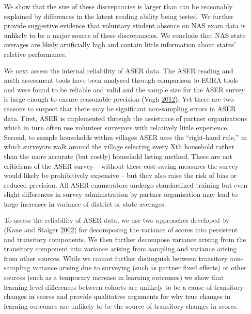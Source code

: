 \documentclass[
  11pt,
]{article}
\begin{document}
We show that the size of these discrepancies is larger than can be reasonably explained by differences in the latent reading ability being tested. We further provide suggestive evidence that voluntary student absence on NAS exam data is unlikely to be a major source of these discrepancies. We conclude that NAS state averages are likely artificially high and contain little information about states' relative performance.

We next assess the internal reliability of ASER data. The ASER reading and math assessment tools have been analysed through comparison to EGRA tools and were found to be reliable and valid and the sample size for the ASER survey is large enough to ensure reasonable precision (Vagh \protect\hyperlink{ref-vagh2012validating}{2012}). Yet there are two reasons to suspect that there may be significant non-sampling errors in ASER data. First, ASER is implemented through the assistance of partner organizations which in turn often use volunteer surveyors with relatively little experience. Second, to sample households within villages ASER uses the ``right-hand rule,'' in which surveyors walk around the village selecting every Xth household rather than the more accurate (but costly) household listing method. These are not criticisms of the ASER survey -- without these cost-saving measures the survey would likely be prohibitively expensive -- but they also raise the risk of bias or reduced precision. All ASER enumerators undergo standardized training but even slight differences in survey administration by partner organization may lead to large increases in variance of district or state averages.

To assess the reliability of ASER data, we use two approaches developed by (Kane and Staiger \protect\hyperlink{ref-kane2002promise}{2002}) for decomposing the variance of scores into persistent and transitory components. We then further decompose variance arising from the transitory component into variance arising from sampling and variance arising from other sources. While we cannot further distinguish between transitory non- sampling variance arising due to surveying (such as partner fixed effects) or other sources (such as a temporary increase in learning outcomes) we show that learning level differences between cohorts are unlikely to be a cause of transitory changes in scores and provide qualitative arguments for why true changes in learning outcomes are unlikely to be the source of transitory changes in scores.
\end{document}
